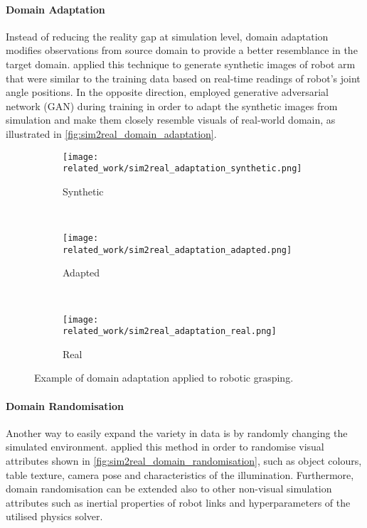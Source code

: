 \paragraph{Domain Adaptation} Instead of reducing the reality gap at simulation level, domain adaptation modifies observations from source domain to provide a better resemblance in the target domain. \citet{zhang_towards_2015} applied this technique to generate synthetic images of robot arm that were similar to the training data based on real-time readings of robot's joint angle positions. In the opposite direction, \citet{bousmalis_using_2018} employed generative adversarial network (GAN) during training in order to adapt the synthetic images from simulation and make them closely resemble visuals of real-world domain, as illustrated in \autoref{fig:sim2real_domain_adaptation}.

\begin{figure}[ht]
    \centering
    \begin{subfigure}[ht]{0.25\textwidth}
        \centering
        \texttt{[image: related\_work/sim2real\_adaptation\_synthetic.png]}
        \caption*{Synthetic}
    \end{subfigure}%
    ~
    \begin{subfigure}[ht]{0.25\textwidth}
        \centering
        \texttt{[image: related\_work/sim2real\_adaptation\_adapted.png]}
        \caption*{Adapted}
    \end{subfigure}%
    ~
    \begin{subfigure}[ht]{0.25\textwidth}
        \centering
        \texttt{[image: related\_work/sim2real\_adaptation\_real.png]}
        \caption*{Real}
    \end{subfigure}%
    \caption{Example of domain adaptation applied to robotic grasping.~\protect\cite{bousmalis_using_2018}}
    \label{fig:sim2real_domain_adaptation}
\end{figure}

\newpage

\paragraph{Domain Randomisation} Another way to easily expand the variety in data is by randomly changing the simulated environment. \citet{tobin_domain_2017} applied this method in order to randomise visual attributes shown in \autoref{fig:sim2real_domain_randomisation}, such as object colours, table texture, camera pose and characteristics of the illumination. Furthermore, domain randomisation can be extended also to other non-visual simulation attributes such as inertial properties of robot links and hyperparameters of the utilised physics solver.

